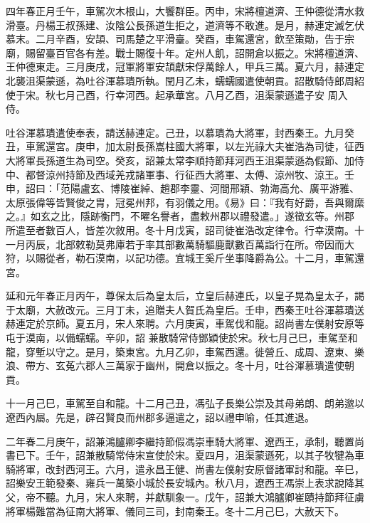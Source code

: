 \begin{pinyinscope}
 四年春正月壬午，車駕次木根山，大饗群臣。丙申，宋將檀道濟、王仲德從清水救滑臺。丹楊王叔孫建、汝陰公長孫道生拒之，道濟等不敢進。是月，赫連定滅乞伏慕末。二月辛酉，安頡、司馬楚之平滑臺。癸酉，車駕還宮，飲至策勛，告于宗廟，賜留臺百官各有差。戰士賜復十年。定州人飢，詔開倉以振之。宋將檀道濟、王仲德東走。三月庚戌，冠軍將軍安頡獻宋俘萬餘人，甲兵三萬。夏六月，赫連定北襲沮渠蒙遜，為吐谷渾慕璝所執。閏月乙未，蠕蠕國遣使朝貢。詔散騎侍郎周紹使于宋。秋七月己酉，行幸河西。起承華宮。八月乙酉，沮渠蒙遜遣子安
 周入侍。



 吐谷渾慕璝遣使奉表，請送赫連定。己丑，以慕璝為大將軍，封西秦王。九月癸丑，車駕還宮。庚申，加太尉長孫嵩柱國大將軍，以左光祿大夫崔浩為司徒，征西大將軍長孫道生為司空。癸亥，詔兼太常李順持節拜河西王沮渠蒙遜為假節、加侍中、都督涼州持節及西域羌戎諸軍事、行征西大將軍、太傅、涼州牧、涼王。壬申，詔曰：「范陽盧玄、博陵崔綽、趙郡李靈、河間邢穎、勃海高允、廣平游雅、太原張偉等皆賢俊之胄，冠冕州邦，有羽儀之用。《易》曰：『我有好爵，吾與爾縻之。』如玄之比，隱跡衡門，不曜名譽者，盡敕州郡以禮發遣。」遂徵玄等。州郡
 所遣至者數百人，皆差次敘用。冬十月戊寅，詔司徒崔浩改定律令。行幸漠南。十一月丙辰，北部敕勒莫弗庫若于率其部數萬騎驅鹿獸數百萬詣行在所。帝因而大狩，以賜從者，勒石漠南，以記功德。宜城王奚斤坐事降爵為公。十二月，車駕還宮。



 延和元年春正月丙午，尊保太后為皇太后，立皇后赫連氏，以皇子晃為皇太子，謁于太廟，大赦改元。三月丁未，追贈夫人賀氏為皇后。壬申，西秦王吐谷渾慕璝送赫連定於京師。夏五月，宋人來聘。六月庚寅，車駕伐和龍。詔尚書左僕射安原等屯于漠南，以備蠕蠕。辛卯，詔
 兼散騎常侍鄧穎使於宋。秋七月己巳，車駕至和龍，穿塹以守之。是月，築東宮。九月乙卯，車駕西還。徙營丘、成周、遼東、樂浪、帶方、玄菟六郡人三萬家于幽州，開倉以振之。冬十月，吐谷渾慕璝遣使朝貢。



 十一月己巳，車駕至自和龍。十二月己丑，馮弘子長樂公崇及其母弟朗、朗弟邈以遼西內屬。先是，辟召賢良而州郡多逼遣之，詔以禮申喻，任其進退。



 二年春二月庚午，詔兼鴻臚卿李繼持節假馮崇車騎大將軍、遼西王，承制，聽置尚書已下。壬午，詔兼散騎常侍宋宣使於宋。夏四月，沮渠蒙遜死，以其子牧犍為車
 騎將軍，改封西河王。六月，遣永昌王健、尚書左僕射安原督諸軍討和龍。辛巳，詔樂安王範發秦、雍兵一萬築小城於長安城內。秋八月，遼西王馮崇上表求說降其父，帝不聽。九月，宋人來聘，并獻馴象一。戊午，詔兼大鴻臚卿崔賾持節拜征虜將軍楊難當為征南大將軍、儀同三司，封南秦王。冬十二月己巳，大赦天下。




\end{pinyinscope}
